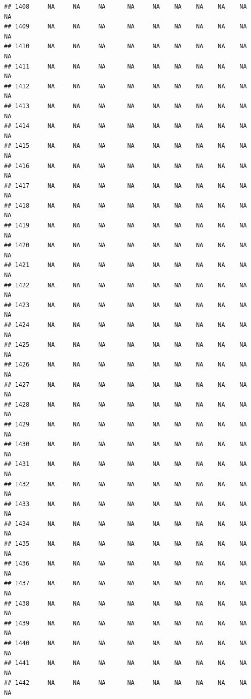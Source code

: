 \documentclass{article}\usepackage{graphicx, color}
\makeatletter
\newenvironment{kframe}{%
 \def\at@end@of@kframe{}%
 \ifinner\ifhmode%
  \def\at@end@of@kframe{\end{minipage}}%
  \begin{minipage}{\columnwidth}%
 \fi\fi%
 \def\FrameCommand##1{\hskip\@totalleftmargin \hskip-\fboxsep
 \colorbox{shadecolor}{##1}\hskip-\fboxsep
     \hskip-\linewidth \hskip-\@totalleftmargin \hskip\columnwidth}%
 \MakeFramed {\advance\hsize-\width
   \@totalleftmargin\z@ \linewidth\hsize
   \@setminipage}}%
 {\par\unskip\endMakeFramed%
 \at@end@of@kframe}
\newenvironment{knitrout}{}{} %
\makeatother
\begin{document}
\begin{knitrout}
\begin{kframe}
\begin{verbatim}
## 1408     NA     NA     NA      NA     NA    NA    NA    NA    NA     NA
## 1409     NA     NA     NA      NA     NA    NA    NA    NA    NA     NA
## 1410     NA     NA     NA      NA     NA    NA    NA    NA    NA     NA
## 1411     NA     NA     NA      NA     NA    NA    NA    NA    NA     NA
## 1412     NA     NA     NA      NA     NA    NA    NA    NA    NA     NA
## 1413     NA     NA     NA      NA     NA    NA    NA    NA    NA     NA
## 1414     NA     NA     NA      NA     NA    NA    NA    NA    NA     NA
## 1415     NA     NA     NA      NA     NA    NA    NA    NA    NA     NA
## 1416     NA     NA     NA      NA     NA    NA    NA    NA    NA     NA
## 1417     NA     NA     NA      NA     NA    NA    NA    NA    NA     NA
## 1418     NA     NA     NA      NA     NA    NA    NA    NA    NA     NA
## 1419     NA     NA     NA      NA     NA    NA    NA    NA    NA     NA
## 1420     NA     NA     NA      NA     NA    NA    NA    NA    NA     NA
## 1421     NA     NA     NA      NA     NA    NA    NA    NA    NA     NA
## 1422     NA     NA     NA      NA     NA    NA    NA    NA    NA     NA
## 1423     NA     NA     NA      NA     NA    NA    NA    NA    NA     NA
## 1424     NA     NA     NA      NA     NA    NA    NA    NA    NA     NA
## 1425     NA     NA     NA      NA     NA    NA    NA    NA    NA     NA
## 1426     NA     NA     NA      NA     NA    NA    NA    NA    NA     NA
## 1427     NA     NA     NA      NA     NA    NA    NA    NA    NA     NA
## 1428     NA     NA     NA      NA     NA    NA    NA    NA    NA     NA
## 1429     NA     NA     NA      NA     NA    NA    NA    NA    NA     NA
## 1430     NA     NA     NA      NA     NA    NA    NA    NA    NA     NA
## 1431     NA     NA     NA      NA     NA    NA    NA    NA    NA     NA
## 1432     NA     NA     NA      NA     NA    NA    NA    NA    NA     NA
## 1433     NA     NA     NA      NA     NA    NA    NA    NA    NA     NA
## 1434     NA     NA     NA      NA     NA    NA    NA    NA    NA     NA
## 1435     NA     NA     NA      NA     NA    NA    NA    NA    NA     NA
## 1436     NA     NA     NA      NA     NA    NA    NA    NA    NA     NA
## 1437     NA     NA     NA      NA     NA    NA    NA    NA    NA     NA
## 1438     NA     NA     NA      NA     NA    NA    NA    NA    NA     NA
## 1439     NA     NA     NA      NA     NA    NA    NA    NA    NA     NA
## 1440     NA     NA     NA      NA     NA    NA    NA    NA    NA     NA
## 1441     NA     NA     NA      NA     NA    NA    NA    NA    NA     NA
## 1442     NA     NA     NA      NA     NA    NA    NA    NA    NA     NA

\end{verbatim}
\end{kframe}
\end{knitrout}
\end{document}
